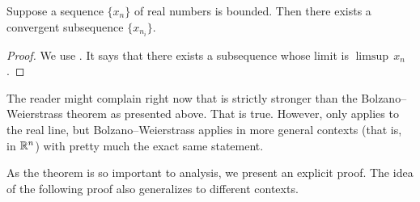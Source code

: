 \begin{thm}\label{thm:bwseq}
Suppose a sequence $\{ x_n \}$ of real numbers is bounded.
Then there exists a convergent subsequence $\{ x_{n_i} \}$.
\end{thm}

\begin{proof}
We use .  It says that there exists
a subsequence whose limit is $\limsup \, x_n$.
\end{proof}

The reader might complain right now that 
 is strictly stronger than the
Bolzano--Weierstrass theorem as presented above.  That is true.
However, 
 only applies to the real line, but
Bolzano--Weierstrass applies in more general contexts (that is, in ${\mathbb{R}}^n$)
with pretty much the exact same statement.

As the theorem is so important to analysis, we present an explicit
proof.
The idea of the following proof also generalizes to different contexts.

